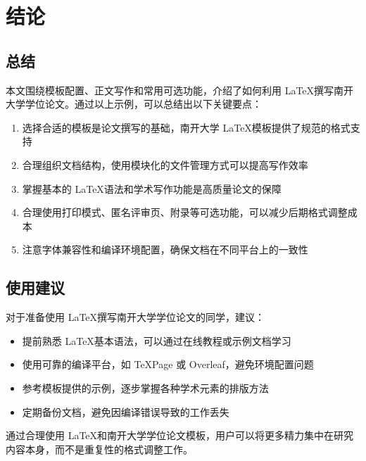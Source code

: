 
\chapter{结论}

\section{总结}

本文围绕模板配置、正文写作和常用可选功能，介绍了如何利用 \LaTeX 撰写南开大学学位论文。通过以上示例，可以总结出以下关键要点：

\begin{enumerate}
    \item 选择合适的模板是论文撰写的基础，南开大学 \LaTeX 模板提供了规范的格式支持
    \item 合理组织文档结构，使用模块化的文件管理方式可以提高写作效率
    \item 掌握基本的 \LaTeX 语法和学术写作功能是高质量论文的保障
    \item 合理使用打印模式、匿名评审页、附录等可选功能，可以减少后期格式调整成本
    \item 注意字体兼容性和编译环境配置，确保文档在不同平台上的一致性
\end{enumerate}

\section{使用建议}

对于准备使用 \LaTeX 撰写南开大学学位论文的同学，建议：

\begin{itemize}
    \item 提前熟悉 \LaTeX 基本语法，可以通过在线教程或示例文档学习
    \item 使用可靠的编译平台，如 TeXPage 或 Overleaf，避免环境配置问题
    \item 参考模板提供的示例，逐步掌握各种学术元素的排版方法
    \item 定期备份文档，避免因编译错误导致的工作丢失
\end{itemize}

通过合理使用 \LaTeX 和南开大学学位论文模板，用户可以将更多精力集中在研究内容本身，而不是重复性的格式调整工作。
